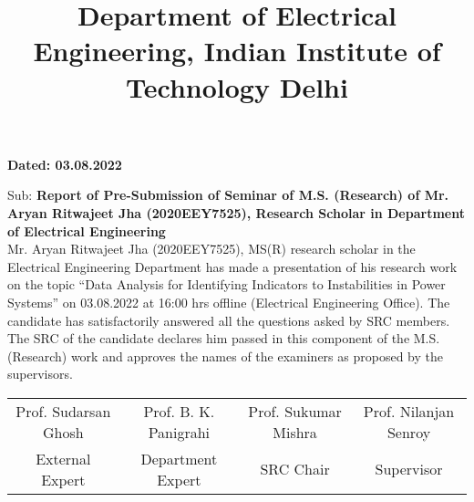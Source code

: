 \documentclass{article}
\begin{document}
	\title{\rmfamily\bfseries\normalsize Department of Electrical Engineering, Indian Institute of Technology Delhi}
	\date{}
	\maketitle
	
	\vspace{-8em}
	\begin{flushright}
		{\rmfamily\bfseries Dated: 03.08.2022} \\
	\end{flushright}
	
	\noindent
	Sub: {\rmfamily\bfseries Report of Pre-Submission of Seminar of M.S. (Research) of Mr. Aryan Ritwajeet Jha (2020EEY7525), Research Scholar in Department of Electrical Engineering}\\[15pt]
	
	\noindent
	Mr. Aryan Ritwajeet Jha (2020EEY7525), MS(R) research scholar in the Electrical Engineering Department has made a presentation of his research work on the topic ``Data Analysis for Identifying Indicators to Instabilities in Power Systems'' on 03.08.2022 at 16:00 hrs offline (Electrical Engineering Office). The candidate has satisfactorily answered all the questions asked by SRC members. The SRC of the candidate declares him passed in this component of the M.S. (Research) work and approves the names of the examiners as proposed by the supervisors. \\
	
	\vspace{10em}
	
		\begin{table}[ht]
			\centering
			\hspace*{-5em}
			\begin{tabular}{cccc}
				Prof. Sudarsan Ghosh & Prof. B. K. Panigrahi & Prof. Sukumar Mishra & Prof. Nilanjan Senroy \\
				External Expert & Department Expert & SRC Chair & Supervisor
			\end{tabular}
		\end{table}
	
	
\end{document}
